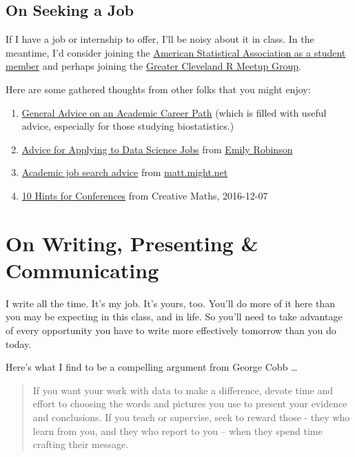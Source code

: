 \documentclass[
]{book}
\providecommand{\tightlist}{%
  \setlength{\itemsep}{0pt}\setlength{\parskip}{0pt}}
\begin{document}
\hypertarget{on-seeking-a-job}{%
\section{On Seeking a Job}\label{on-seeking-a-job}}

If I have a job or internship to offer, I'll be noisy about it in class. In the meantime, I'd consider joining the \href{https://www.amstat.org/ASA/Membership/home.aspx}{American Statistical Association as a student member} and perhaps joining the \href{https://www.meetup.com/Cleveland-UseR-Group/}{Greater Cleveland R Meetup Group}.

Here are some gathered thoughts from other folks that you might enjoy:

\begin{enumerate}
\def\labelenumi{\arabic{enumi}.}
\tightlist
\item
  \href{https://github.com/stephaniehicks/classroomNotes/blob/master/academicJobNotes.md}{General Advice on an Academic Career Path} (which is filled with useful advice, especially for those studying biostatistics.)
\item
  \href{https://hookedondata.org/advice-for-applying-to-data-science-jobs/}{Advice for Applying to Data Science Jobs} from \href{https://hookedondata.org/}{Emily Robinson}
\item
  \href{http://matt.might.net/articles/advice-for-academic-job-hunt/}{Academic job search advice} from \href{http://matt.might.net/articles/}{matt.might.net}
\item
  \href{https://creativemaths.net/blog/conference_10_ways/}{10 Hints for Conferences} from Creative Maths, 2016-12-07
\end{enumerate}

\hypertarget{on-writing-presenting-communicating}{%
\chapter{On Writing, Presenting \& Communicating}\label{on-writing-presenting-communicating}}

I write all the time. It's my job. It's yours, too. You'll do more of it here than you may be expecting in this class, and in life. So you'll need to take advantage of every opportunity you have to write more effectively tomorrow than you do today.

Here's what I find to be a compelling argument from George Cobb \ldots{}

\begin{quote}
If you want your work with data to make a difference, devote time and effort to choosing the words and pictures you use to present your evidence and conclusions. If you teach or supervise, seek to reward those - they who learn from you, and they who report to you -- when they spend time crafting their message.
\end{quote}
\end{document}
